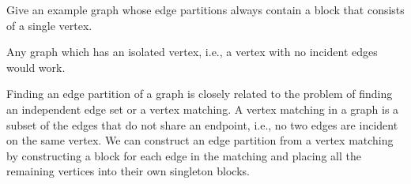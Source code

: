 \begin{flex}
\begin{exercise}
Give an example graph whose edge partitions always contain a block
that consists of a single vertex.
\end{exercise}

\begin{solution}
Any graph which has an isolated vertex, i.e., a vertex with no
incident edges would work.
\end{solution}
\end{flex}

\begin{gram}
%
%
Finding an edge partition of a graph is closely related to the
problem of finding an independent edge set or a vertex matching.
%
A vertex matching in  a graph is a subset of the edges that do not share an endpoint, i.e., no two edges are incident on the same vertex.
%
We can construct an edge partition from a vertex matching by
constructing a block for each edge in the matching and placing all the
remaining vertices into their own singleton blocks.
\end{gram}


